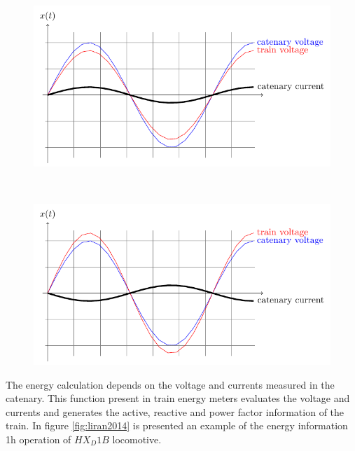 \begin{figure}[h!]
	\centering
	\begin{minipage}{.48\textwidth}
		\centering
			\includegraphics[width=1\textwidth,keepaspectratio]{figures/32.EnergyS/traction}
		\label{fig:traction}
	\end{minipage}%
	\begin{minipage}{.01\textwidth}  ~\end{minipage}	
	\begin{minipage}{.48\textwidth}
		\centering
		\includegraphics[width=1\textwidth,keepaspectratio]{figures/32.EnergyS/generation}

		
		\label{fig:generation}
	\end{minipage}
\end{figure}

The energy calculation depends on the voltage and currents measured in the catenary. This function present in train energy meters evaluates the voltage and currents and generates the active, reactive and power factor information of the train. In figure \ref{fig:liran2014} is presented an example of the energy information 1h operation of {$HX_D1B$} locomotive.



